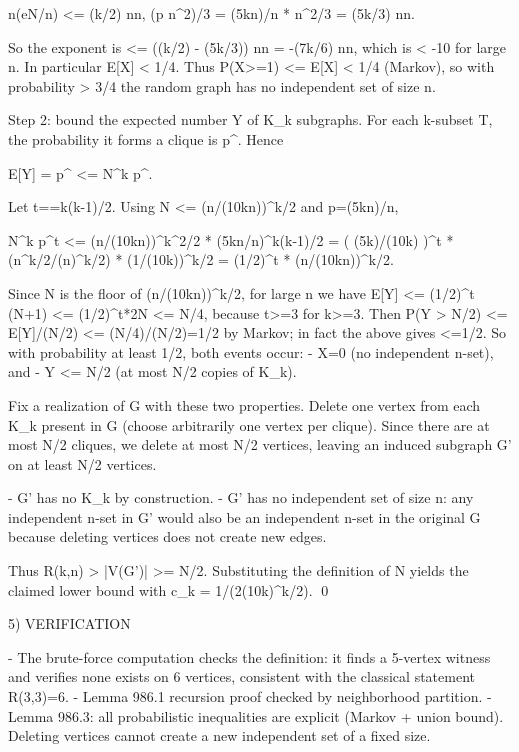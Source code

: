   n\log(eN/n) <= (k/2) n\log n,
  (p n^2)/3 = (5k\log n)/n * n^2/3 = (5k/3) n\log n.

So the exponent is <= ((k/2) - (5k/3)) n\log n = -(7k/6) n\log n,
which is < -10 for large n. In particular E[X] < 1/4.
Thus P(X>=1) <= E[X] < 1/4 (Markov), so with probability > 3/4 the random graph has
no independent set of size n.

Step 2: bound the expected number Y of K_k subgraphs.
For each k-subset T, the probability it forms a clique is p^{}. Hence

  E[Y] =  p^{} <= N^k p^{}.

Let t==k(k-1)/2. Using N <= (n/(10k\log n))^{k/2} and p=(5k\log n)/n,

  N^k p^t
  <= (n/(10k\log n))^{k^2/2} * (5k\log n/n)^{k(k-1)/2}
  = ( (5k)/(10k) )^{t} * (n^{k/2}/(\log n)^{k/2}) * (1/(10k))^{k/2}
  = (1/2)^{t} * (n/(10k\log n))^{k/2}.

Since N is the floor of (n/(10k\log n))^{k/2}, for large n we have
E[Y] <= (1/2)^{t} (N+1) <= (1/2)^{t}*2N <= N/4,
because t>=3 for k>=3.
Then P(Y > N/2) <= E[Y]/(N/2) <= (N/4)/(N/2)=1/2 by Markov; in fact the above gives <=1/2.
So with probability at least 1/2, both events occur:
- X=0 (no independent n-set), and
- Y <= N/2 (at most N/2 copies of K_k).

Fix a realization of G with these two properties.
Delete one vertex from each K_k present in G (choose arbitrarily one vertex per clique).
Since there are at most N/2 cliques, we delete at most N/2 vertices, leaving an induced
subgraph G' on at least N/2 vertices.

- G' has no K_k by construction.
- G' has no independent set of size n: any independent n-set in G' would also be an
  independent n-set in the original G because deleting vertices does not create new edges.

Thus R(k,n) > |V(G')| >= N/2.
Substituting the definition of N yields the claimed lower bound with
c_k = 1/(2(10k)^{k/2}).
\qed

5) VERIFICATION

- The brute-force computation checks the definition: it finds a 5-vertex witness and
  verifies none exists on 6 vertices, consistent with the classical statement R(3,3)=6.
- Lemma 986.1 recursion proof checked by neighborhood partition.
- Lemma 986.3: all probabilistic inequalities are explicit (Markov + union bound).
  Deleting vertices cannot create a new independent set of a fixed size.

